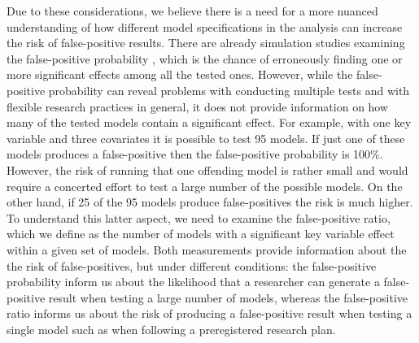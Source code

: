Due to these considerations, we believe there is a need for a more nuanced understanding of how different model specifications in the analysis can increase the risk of false-positive results. There are already simulation studies examining the false-positive probability \citep{Simmons2011}, which is the chance of erroneously finding one or more significant effects among all the tested ones. However, while the false-positive probability can reveal problems with conducting multiple tests and with flexible research practices in general, it does not provide information on how many of the tested models contain a significant effect. For example, with one key variable and three covariates it is possible to test 95 models. If just one of these models produces a false-positive then the false-positive probability is 100\%. However, the risk of running that one offending model is rather small and would require a concerted effort to test a large number of the possible models. On the other hand, if 25 of the 95 models produce false-positives the risk is much higher. To understand this latter aspect, we need to examine the false-positive ratio, which we define as the number of models with a significant key variable effect within a given set of models. Both measurements provide information about the the risk of false-positives, but under different conditions: the false-positive probability inform us about the likelihood that a researcher can generate a false-positive result when testing a large number of models, whereas the false-positive ratio informs us about the risk of producing a false-positive result when testing a single model such as when following a preregistered research plan. \\

